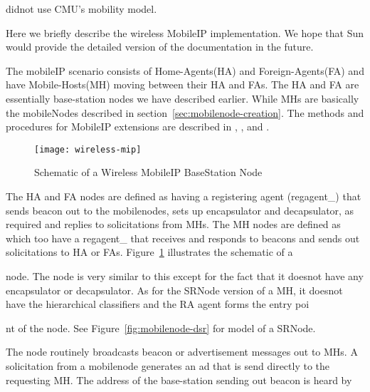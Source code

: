 { didnot use CMU's mobility model.

Here we briefly describe the wireless MobileIP implementation. We hope that Sun would provide the detailed version of the documentation in the future.

The mobileIP scenario consists of Home-Agents(HA) and Foreign-Agents(FA) and have Mobile-Hosts(MH) moving between their HA and FAs.
The HA and FA are essentially base-station nodes we have described earlier. While MHs are basically the mobileNodes described in section~\ref{sec:mobilenode-creation}.
The methods and procedures for MobileIP extensions are described in , ,  and .

\begin{figure}
    \centerline{\texttt{[image: wireless-mip]}}
    \caption{Schematic of a Wireless MobileIP BaseStation Node}
    \label{fig:mobilenode-wireless-mip}
\end{figure}
The HA and FA nodes are defined as  having a registering agent (regagent\_) that sends beacon out to the mobilenodes, sets up encapsulator and decapsulator, as required and replies to solicitations from MHs. 
The MH nodes are defined as  which too have a regagent\_ that receives and responds to beacons and sends out solicitations to HA or FAs. Figure~\ref{fig:mobilenode-wireless-mip} illustrates the schematic of a 









 node. The  node is very similar to this except for the fact that it doesnot have any encapsulator or decapsulator. As for the SRNode version of a MH, it doesnot have the hierarchical classifiers and the RA agent forms the entry poi









nt of the node. See Figure~\ref{fig:mobilenode-dsr} for model of a SRNode.

The  node routinely broadcasts beacon or advertisement messages out to MHs. A solicitation from a mobilenode generates an ad that is send directly to the requesting MH. The address of the base-station sending out beacon is heard by 









}
